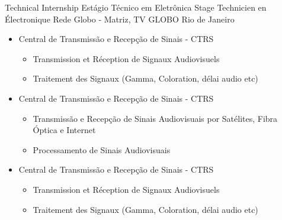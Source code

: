 \cventry{\apr\ 2013\newline \sep\ 2013\newline}
{
  \ml
  {Technical Internship}
  {Estágio Técnico em Eletrônica}
  {Stage Technicien en Électronique}}
{\newline Rede Globo - Matriz, TV GLOBO}
{Rio de Janeiro}
{\brazil}
{\ml
  {
    \begin{itemize}
    \item Central de Transmissão e Recepção de Sinais - CTRS
      \begin{itemize}
        \item Transmission et Réception de Signaux Audiovisuels
      \item Traitement des Signaux (Gamma, Coloration, délai audio etc)
      \end{itemize}
    \end{itemize}
  }
  {
    \begin{itemize}
    \item Central de Transmissão e Recepção de Sinais - CTRS
      \begin{itemize}
      \item Transmissão e Recepção de Sinais Audiovisuais por Satélites, Fibra Óptica e Internet
      \item Processamento de Sinais Audiovisuais
      \end{itemize}
    \end{itemize}
  }
  {
    \begin{itemize}
    \item Central de Transmissão e Recepção de Sinais - CTRS
      \begin{itemize}
        \item Transmission et Réception de Signaux Audiovisuels
      \item Traitement des Signaux (Gamma, Coloration, délai audio etc)
      \end{itemize}
    \end{itemize}
  }
}
